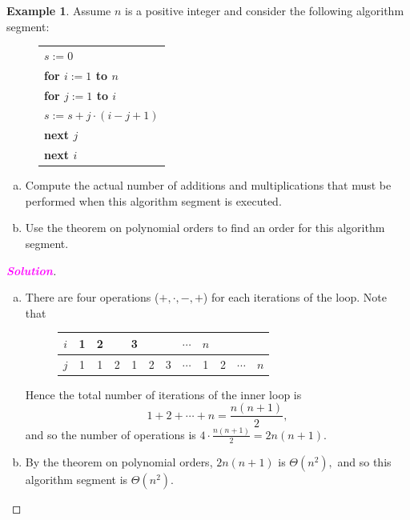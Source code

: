 \documentclass[12pt,openany]{book}
\theoremstyle{definition}
\newtheorem{example}{Example}[chapter]
\newcommand{\sol}{\textcolor{magenta}{\bf Solution}}
\newcommand{\tab}{\hspace{8pt}}
\begin{document}
	\newpage
	\begin{example}
		Assume $n$ is a positive integer and consider the following algorithm segment:
		\begin{figure}[h!]
			\centering
			\begin{tabular}{l}
				$s:=0$\\
				\textbf{for $i:=1$ to $n$}\\
				\tab\textbf{for $j:=1$ to $i$}\\
				\tab\tab$s:=s+j\cdot(i-j+1)$\\
				\tab\textbf{next $j$}\\
				\textbf{next $i$}
			\end{tabular}
		\end{figure}
		\begin{enumerate}[a.]
			\item Compute the actual number of additions and multiplications that must be performed when this algorithm segment is executed.
			\item Use the theorem on polynomial orders to find an order for this algorithm segment.
		\end{enumerate}
		\begin{proof}[\sol]
			\ \begin{enumerate}[a.]
				\item There are four operations ($+,\cdot,-,+$) for each iterations of the loop. Note that \begin{figure}[h!]
					\centering
					\begin{tabular}{c||c|cc|ccc|c|cccc}
						\toprule[1.2pt]
						$i$ & 1 & 2 &   & 3 &   &   &$\cdots$ & $n$ &&&\\
						\hline
						\hline
						$j$ & 1 & 1 & 2 & 1 & 2 & 3 &$\cdots$ & 1 & 2 &$\cdots$&$n$\\
						\bottomrule[1.2pt]
					\end{tabular}
				\end{figure} Hence the total number of iterations of the inner loop is \[
				1+2+\cdots+n=\frac{n(n+1)}{2},
				\] and so the number of operations is $
				4\cdot\frac{n(n+1)}{2}=2n(n+1).$
				\item By the theorem on polynomial orders, $
				2n(n+1)$ is $\Theta(n^2),
				$ and so this algorithm segment is  $\Theta(n^2)$.
			\end{enumerate}
		\end{proof}
	\end{example}
	
\end{document}
